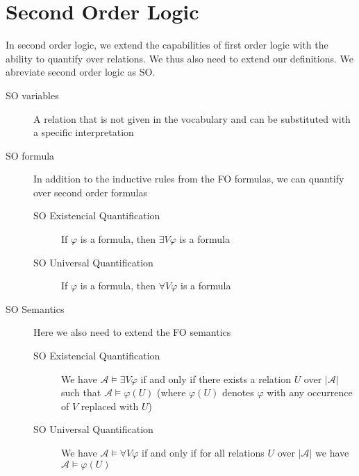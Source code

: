 \section{Second Order Logic}\label{sec:second-order-logic}
In second order logic, we extend the capabilities of first order logic with the ability to quantify over relations. We thus also need to extend our definitions. We abreviate second order logic as SO.
\begin{description}
    \item[SO variables] A relation that is not given in the vocabulary and can be substituted with a specific interpretation
    \item[SO formula] In addition to the inductive rules from the FO formulas, we can quantify over second order formulas
    \begin{description}
        \item[SO Existencial Quantification] If $\varphi$ is a formula, then $\exists V\varphi$ is a formula
        \item[SO Universal Quantification] If $\varphi$ is a formula, then $\forall V\varphi$ is a formula
    \end{description}
    \item[SO Semantics] Here we also need to extend the FO semantics
    \begin{description}
        \item[SO Existencial Quantification]  We have $\mathcal{A} \models \exists V\varphi$ if and only if there exists a relation $U$ over $|\mathcal{A}|$ such that $\mathcal{A} \models \varphi(U)$ (where $\varphi(U)$ denotes $\varphi$ with any occurrence of $V$ replaced with $U$)
        \item[SO Universal Quantification] We have $\mathcal{A} \models \forall V\varphi$ if and only if for all relations $U$ over $|\mathcal{A}|$ we have $\mathcal{A} \models \varphi(U)$
    \end{description}
\end{description}


